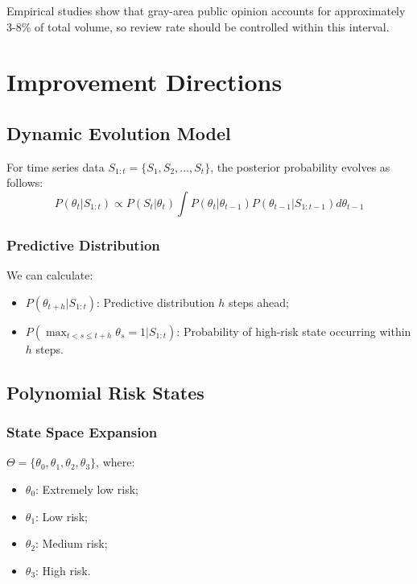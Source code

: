 \documentclass[11pt,a4paper]{report}
\begin{document}
Empirical studies show that gray-area public opinion accounts for approximately 3-8\% of total volume, so review rate should be controlled within this interval.

\section{Improvement Directions}

\subsection{Dynamic Evolution Model}

For time series data $S_{1:t} = \{S_1, S_2, \dots, S_t\}$, the posterior probability evolves as follows:
\begin{equation}
P(\theta_t|S_{1:t}) \propto P(S_t|\theta_t) \int P(\theta_t|\theta_{t-1}) P(\theta_{t-1}|S_{1:t-1}) d\theta_{t-1}
\end{equation}

\subsubsection{Predictive Distribution}

We can calculate:
\begin{itemize}[leftmargin=*]
    \item $P(\theta_{t+h}|S_{1:t})$: Predictive distribution $h$ steps ahead;
    \item $P(\max_{t<s\leq t+h} \theta_s = 1|S_{1:t})$: Probability of high-risk state occurring within $h$ steps.
\end{itemize}

\subsection{Polynomial Risk States}

\subsubsection{State Space Expansion}
$\Theta = \{\theta_0, \theta_1, \theta_2, \theta_3\}$, where:
\begin{itemize}[leftmargin=*]
    \item $\theta_0$: Extremely low risk;
    \item $\theta_1$: Low risk;
    \item $\theta_2$: Medium risk;
    \item $\theta_3$: High risk.
\end{itemize}
\end{document}
